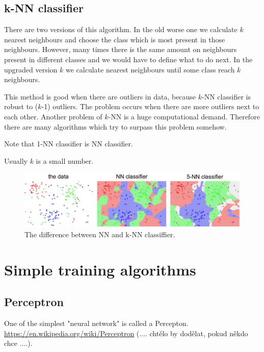 \subsection{k-NN classifier}
There are two versions of this algorithm. In the old worse one we calculate $k$ nearest neighbours and choose the class which is most present in those neighbours. However, many times there is the same amount on neighbours present in different classes and we would have to define what to do next. In the upgraded version $k$ we calculate nearest neighbours until some class reach $k$ neighbours.

This method is good when there are outliers in data, because $k$-NN classifier is robust to ($k$-1) outliers. The problem occurs when there are more outliers next to each other. Another problem of $k$-NN is a huge computational demand. Therefore there are many algorithms which try to surpass this problem somehow.

\begin{remark}
	Note that 1-NN classifier is NN classifier.
\end{remark}

\begin{remark}
	Usually $k$ is a small number.
\end{remark}

\begin{figure}[h]
	\centering
	\includegraphics[scale=0.45]{kNNclf.jpg}
	\caption{The difference between NN and k-NN classiffier.}
\end{figure}

\section{Simple training algorithms}

\subsection{Perceptron}
One of the simplest "neural network" is called a Percepton. \url{https://en.wikipedia.org/wiki/Perceptron}  (.... chtělo by dodělat, pokud někdo chce ....).

